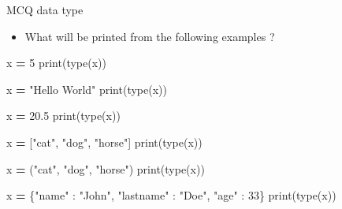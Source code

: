 \documentclass[
  8pt,
  ignorenonframetext,
]{beamer}
\newenvironment{Shaded}{\begin{snugshade}}{\end{snugshade}}
\newcommand{\BuiltInTok}[1]{#1}
\newcommand{\DecValTok}[1]{\textcolor[rgb]{0.00,0.00,0.81}{#1}}
\newcommand{\FloatTok}[1]{\textcolor[rgb]{0.00,0.00,0.81}{#1}}
\newcommand{\NormalTok}[1]{#1}
\newcommand{\OperatorTok}[1]{\textcolor[rgb]{0.81,0.36,0.00}{\textbf{#1}}}
\newcommand{\StringTok}[1]{\textcolor[rgb]{0.31,0.60,0.02}{#1}}
\providecommand{\tightlist}{%
  \setlength{\itemsep}{0pt}\setlength{\parskip}{0pt}}
\begin{document}
\begin{frame}[fragile]{MCQ data type}
\protect\hypertarget{mcq-data-type}{}
\begin{itemize}
\tightlist
\item
  What will be printed from the following examples ?
\end{itemize}

\begin{Shaded}
\begin{Highlighting}[]
\NormalTok{x }\OperatorTok{=} \DecValTok{5}
\BuiltInTok{print}\NormalTok{(}\BuiltInTok{type}\NormalTok{(x))}
\end{Highlighting}
\end{Shaded}

\begin{Shaded}
\begin{Highlighting}[]
\NormalTok{x }\OperatorTok{=} \StringTok{"Hello World"}
\BuiltInTok{print}\NormalTok{(}\BuiltInTok{type}\NormalTok{(x))}
\end{Highlighting}
\end{Shaded}

\begin{Shaded}
\begin{Highlighting}[]
\NormalTok{x }\OperatorTok{=} \FloatTok{20.5}
\BuiltInTok{print}\NormalTok{(}\BuiltInTok{type}\NormalTok{(x))}
\end{Highlighting}
\end{Shaded}

\begin{Shaded}
\begin{Highlighting}[]
\NormalTok{x }\OperatorTok{=}\NormalTok{ [}\StringTok{"cat"}\NormalTok{, }\StringTok{"dog"}\NormalTok{, }\StringTok{"horse"}\NormalTok{]}
\BuiltInTok{print}\NormalTok{(}\BuiltInTok{type}\NormalTok{(x))}
\end{Highlighting}
\end{Shaded}

\begin{Shaded}
\begin{Highlighting}[]
\NormalTok{x }\OperatorTok{=}\NormalTok{ (}\StringTok{"cat"}\NormalTok{, }\StringTok{"dog"}\NormalTok{, }\StringTok{"horse"}\NormalTok{)}
\BuiltInTok{print}\NormalTok{(}\BuiltInTok{type}\NormalTok{(x))}
\end{Highlighting}
\end{Shaded}

\begin{Shaded}
\begin{Highlighting}[]
\NormalTok{x }\OperatorTok{=}\NormalTok{ \{}\StringTok{"name"}\NormalTok{ : }\StringTok{"John"}\NormalTok{, }\StringTok{"lastname"}\NormalTok{ : }\StringTok{"Doe"}\NormalTok{, }\StringTok{"age"}\NormalTok{ : }\DecValTok{33}\NormalTok{\}}
\BuiltInTok{print}\NormalTok{(}\BuiltInTok{type}\NormalTok{(x))}
\end{Highlighting}
\end{Shaded}


\end{frame}
\end{document}
